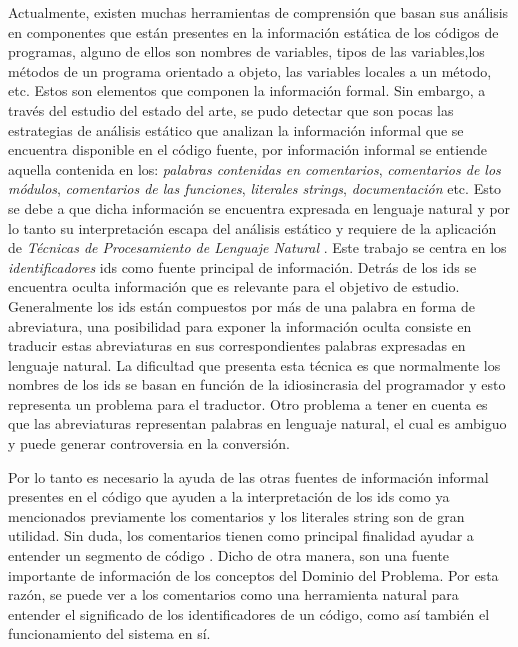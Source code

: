 \documentclass[12pt]{report}
\begin{document}
Actualmente, existen muchas herramientas de comprensión que basan sus análisis en componentes que están presentes en la información estática de los códigos de programas, alguno de ellos son nombres de variables, tipos de las variables,los métodos de un programa orientado a objeto, las variables locales a un método, etc. Estos son elementos que componen la información formal. Sin embargo, a través del estudio del estado del arte, se pudo detectar que son pocas las estrategias de análisis estático que analizan la información informal que se encuentra disponible en el código fuente, por información informal se entiende aquella contenida en 
los: \textit{palabras contenidas en comentarios}, \textit{comentarios de los módulos}, \textit{comentarios de las funciones}, \textit{literales strings}, \textit{documentación} etc.
Esto se debe a que dicha información se encuentra expresada en lenguaje natural y por lo tanto su interpretación escapa del análisis estático y requiere de la aplicación de \textit{Técnicas de Procesamiento de Lenguaje Natural} 
\cite{CHP09,EKS01}.%
Este trabajo se centra en los \textit{identificadores} ids como fuente principal de información. Detrás de los ids se encuentra oculta información que es relevante para el objetivo de estudio. Generalmente los ids están compuestos por más de una palabra en forma de abreviatura, una posibilidad para exponer la información oculta consiste en traducir estas abreviaturas en sus correspondientes palabras expresadas en lenguaje natural. La dificultad que presenta esta técnica es que normalmente los nombres de los ids se basan en función de la idiosincrasia del 
programador \cite{LFBEX, EHPV09}%
y esto representa un problema para el traductor. Otro problema a tener en cuenta es que las abreviaturas representan palabras en lenguaje natural, el cual es ambiguo y puede generar controversia en la conversión.

Por lo tanto es necesario la ayuda de las otras fuentes de información informal presentes en el código que ayuden a la interpretación de los ids como ya mencionados previamente los comentarios y los literales string son de gran utilidad.
Sin duda, los comentarios tienen como principal finalidad ayudar a 
entender un segmento de código \cite{JDPH08}.
Dicho de otra manera, son una fuente importante de información de 
los conceptos del Dominio del Problema. 
Por esta razón, se puede ver a los comentarios como una herramienta 
natural para entender el significado de los identificadores de un código,
como así también el funcionamiento del sistema en sí.
\end{document}

